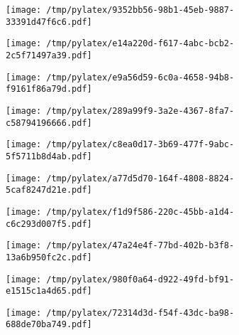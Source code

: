 \documentclass{article}
\begin{document}
\begin{figure}[htbp]
\begin{subfigure}[b]{.3\linewidth}
\texttt{[image: /tmp/pylatex/9352bb56-98b1-45eb-9887-33391d47f6c6.pdf]}
\end{subfigure}
\begin{subfigure}[b]{.3\linewidth}
\texttt{[image: /tmp/pylatex/e14a220d-f617-4abc-bcb2-2c5f71497a39.pdf]}
\end{subfigure}
\begin{subfigure}[b]{.3\linewidth}
\texttt{[image: /tmp/pylatex/e9a56d59-6c0a-4658-94b8-f9161f86a79d.pdf]}
\end{subfigure}
\begin{subfigure}[b]{.3\linewidth}
\texttt{[image: /tmp/pylatex/289a99f9-3a2e-4367-8fa7-c58794196666.pdf]}
\end{subfigure}
\begin{subfigure}[b]{.3\linewidth}
\texttt{[image: /tmp/pylatex/c8ea0d17-3b69-477f-9abc-5f5711b8d4ab.pdf]}
\end{subfigure}
\begin{subfigure}[b]{.3\linewidth}
\texttt{[image: /tmp/pylatex/a77d5d70-164f-4808-8824-5caf8247d21e.pdf]}
\end{subfigure}
\begin{subfigure}[b]{.3\linewidth}
\texttt{[image: /tmp/pylatex/f1d9f586-220c-45bb-a1d4-c6c293d007f5.pdf]}
\end{subfigure}
\begin{subfigure}[b]{.3\linewidth}
\texttt{[image: /tmp/pylatex/47a24e4f-77bd-402b-b3f8-13a6b950fc2c.pdf]}
\end{subfigure}
\begin{subfigure}[b]{.3\linewidth}
\texttt{[image: /tmp/pylatex/980f0a64-d922-49fd-bf91-e1515c1a4d65.pdf]}
\end{subfigure}
\begin{subfigure}[b]{.3\linewidth}
\texttt{[image: /tmp/pylatex/72314d3d-f54f-43dc-ba98-688de70ba749.pdf]}
\end{subfigure}
\end{figure}
\end{document}
